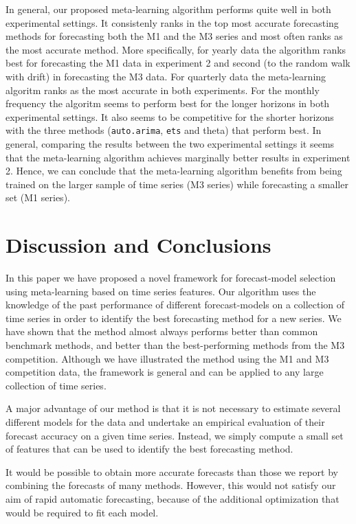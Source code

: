 \documentclass[11pt,a4paper,]{article}
\theoremstyle{definition}
\theoremstyle{definition}
\theoremstyle{definition}
\theoremstyle{remark}
\begin{document}
In general, our proposed meta-learning algorithm performs quite well in
both experimental settings. It consistenly ranks in the top most
accurate forecasting methods for forecasting both the M1 and the M3
series and most often ranks as the most accurate method. More
specifically, for yearly data the algorithm ranks best for forecasting
the M1 data in experiment 2 and second (to the random walk with drift)
in forecasting the M3 data. For quarterly data the meta-learning
algoritm ranks as the most accurate in both experiments. For the monthly
frequency the algoritm seems to perform best for the longer horizons in
both experimental settings. It also seems to be competitive for the
shorter horizons with the three methods (\texttt{auto.arima},
\texttt{ets} and theta) that perform best. In general, comparing the
results between the two experimental settings it seems that the
meta-learning algorithm achieves marginally better results in experiment
2. Hence, we can conclude that the meta-learning algorithm benefits from
being trained on the larger sample of time series (M3 series) while
forecasting a smaller set (M1 series).

\section{Discussion and Conclusions}\label{discussion}

In this paper we have proposed a novel framework for forecast-model
selection using meta-learning based on time series features. Our
algorithm uses the knowledge of the past performance of different
forecast-models on a collection of time series in order to identify the
best forecasting method for a new series. We have shown that the method
almost always performs better than common benchmark methods, and better
than the best-performing methods from the M3 competition. Although we
have illustrated the method using the M1 and M3 competition data, the
framework is general and can be applied to any large collection of time
series.

A major advantage of our method is that it is not necessary to estimate
several different models for the data and undertake an empirical
evaluation of their forecast accuracy on a given time series. Instead,
we simply compute a small set of features that can be used to identify
the best forecasting method.

It would be possible to obtain more accurate forecasts than those we
report by combining the forecasts of many methods. However, this would
not satisfy our aim of rapid automatic forecasting, because of the
additional optimization that would be required to fit each model.
\end{document}
